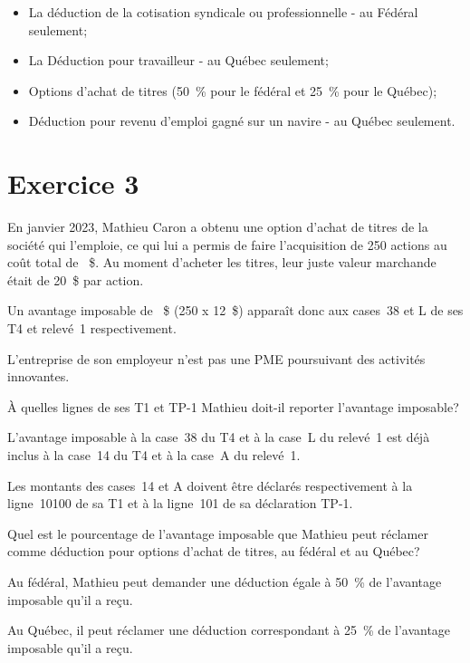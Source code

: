 \begin{itemize}
	\item La déduction de la cotisation syndicale ou professionnelle - au Fédéral seulement;
	\item La \og Déduction pour travailleur \fg{} - au Québec seulement;
	\item Options d'achat de titres (50~\% pour le fédéral et 25~\% pour le Québec); 
	\item Déduction pour revenu d'emploi gagné sur un navire - au Québec seulement.
\end{itemize}



\section{Exercice 3}
\setcounter{question}{0}
\begin{question}
	En janvier 2023, Mathieu Caron a obtenu une option d'achat de titres de la société qui l'emploie, ce qui lui a permis de faire l'acquisition de 250 actions au coût total de ~\$. Au moment d'acheter les titres, leur juste valeur marchande était de 20~\$ par action. 
	
	Un avantage imposable de ~\$ (250 x 12~\$) apparaît donc aux cases~38 et L de ses T4 et relevé~1 respectivement. 
	
	L'entreprise de son employeur n'est pas une PME poursuivant des activités innovantes. 
\end{question}
\setcounter{sousQuestion}{0}
\begin{sousQuestion}
	À quelles lignes de ses T1 et TP-1 Mathieu doit-il reporter l'avantage imposable?
\end{sousQuestion}
L'avantage imposable à la case~38 du T4 et à la case~L du relevé~1 est déjà inclus à la case~14 du T4 et à la case~A du relevé~1.

Les montants des cases~14 et A doivent être déclarés respectivement à la ligne~10100 de sa T1 et à la ligne~101 de sa déclaration TP-1.

\begin{sousQuestion}
	Quel est le pourcentage de l'avantage imposable que Mathieu peut réclamer comme déduction pour options d'achat de titres, au fédéral et au Québec?
\end{sousQuestion}
Au fédéral, Mathieu peut demander une déduction égale à 50~\% de l'avantage imposable qu'il a reçu.

Au Québec, il peut réclamer une déduction correspondant à 25~\% de l'avantage imposable qu'il a reçu.

